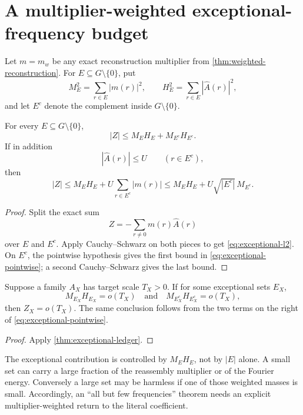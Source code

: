 \section{A multiplier-weighted exceptional-frequency budget}
\label{sec:exceptional-budget}

Let \(m=m_w\) be any exact reconstruction multiplier from
\cref{thm:weighted-reconstruction}.  For
\(E\subseteq G\setminus\{0\}\), put
\[
 M_E^2=\sum_{r\in E}|m(r)|^2,\qquad
 H_E^2=\sum_{r\in E}|\widehat A(r)|^2,
\]
and let \(E^c\) denote the complement inside
\(G\setminus\{0\}\).

\begin{theorem}
\label{thm:exceptional-ledger}
For every \(E\subseteq G\setminus\{0\}\),
\begin{equation}
 |Z|\le M_EH_E+M_{E^c}H_{E^c}.
\label{eq:exceptional-l2}
\end{equation}
If in addition
\[
 |\widehat A(r)|\le U
 \qquad(r\in E^c),
\]
then
\begin{equation}
 |Z|
 \le
 M_EH_E
 +
U\sum_{r\in E^c}|m(r)|
 \le
 M_EH_E+U\sqrt{|E^c|}\,M_{E^c}.
\label{eq:exceptional-pointwise}
\end{equation}
\end{theorem}

\begin{proof}
Split the exact sum
\[
 Z=-\sum_{r\ne0}m(r)\widehat A(r)
\]
over \(E\) and \(E^c\).  Apply Cauchy--Schwarz on both pieces to get
\eqref{eq:exceptional-l2}.  On \(E^c\), the pointwise hypothesis
gives the first bound in \eqref{eq:exceptional-pointwise}; a second
Cauchy--Schwarz gives the last bound.
\end{proof}

\begin{corollary}
\label{cor:coherent-criterion}
Suppose a family \(A_X\) has target scale \(T_X>0\).  If for some
exceptional sets \(E_X\),
\[
 M_{E_X}H_{E_X}=o(T_X)
 \quad\text{and}\quad
 M_{E_X^c}H_{E_X^c}=o(T_X),
\]
then \(Z_X=o(T_X)\).  The same conclusion follows from the two terms
on the right of \eqref{eq:exceptional-pointwise}.
\end{corollary}

\begin{proof}
Apply \cref{thm:exceptional-ledger}.
\end{proof}

\begin{remark}
The exceptional contribution is controlled by \(M_EH_E\), not by
\(|E|\) alone.  A small set can carry a large fraction of the
reassembly multiplier or of the Fourier energy.  Conversely a large
set may be harmless if one of those weighted masses is small.
Accordingly, an ``all but few frequencies'' theorem needs an explicit
multiplier-weighted return to the literal coefficient.
\end{remark}

